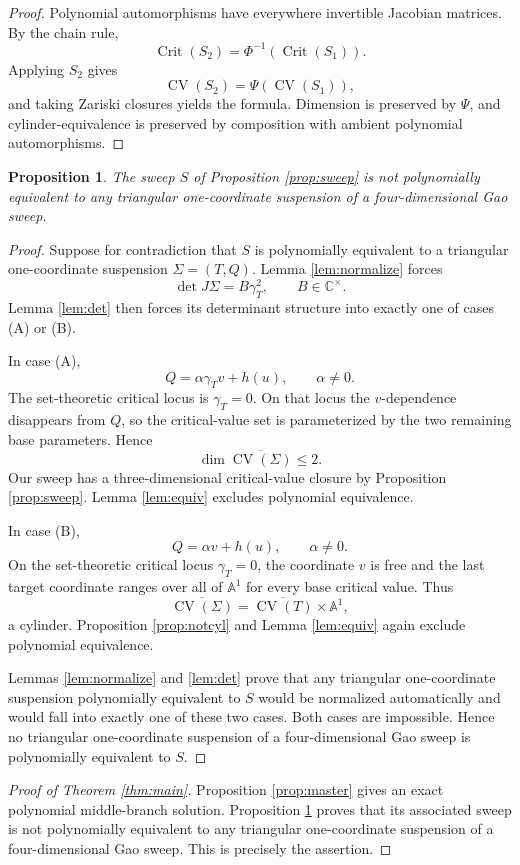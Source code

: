 \documentclass[11pt]{article}
\newtheorem{proposition}[theorem]{Proposition}
\theoremstyle{definition}
\newcommand{\A}{\mathbb A}
\newcommand{\C}{\mathbb C}
\newcommand{\Crit}{\operatorname{Crit}}
\newcommand{\CV}{\operatorname{CV}}
\begin{document}
\begin{proof}
Polynomial automorphisms have everywhere invertible Jacobian matrices. By the chain rule,
\[
\Crit(S_2)=\Phi^{-1}(\Crit(S_1)).
\]
Applying $S_2$ gives
\[
\CV(S_2)=\Psi(\CV(S_1)),
\]
and taking Zariski closures yields the formula. Dimension is preserved by $\Psi$, and cylinder-equivalence is preserved by composition with ambient polynomial automorphisms.
\end{proof}

\begin{proposition}\label{prop:exclude}
The sweep $S$ of Proposition \ref{prop:sweep} is not polynomially equivalent to any triangular one-coordinate suspension of a four-dimensional Gao sweep.
\end{proposition}

\begin{proof}
Suppose for contradiction that $S$ is polynomially equivalent to a triangular one-coordinate suspension $\Sigma=(T,Q)$. Lemma \ref{lem:normalize} forces
\[
\det J\Sigma=B\gamma_T^2,
\qquad B\in\C^\times.
\]
Lemma \ref{lem:det} then forces its determinant structure into exactly one of cases (A) or (B).

In case (A),
\[
Q=\alpha\gamma_T v+h(u),\qquad \alpha\neq0.
\]
The set-theoretic critical locus is $\gamma_T=0$. On that locus the $v$-dependence disappears from $Q$, so the critical-value set is parameterized by the two remaining base parameters. Hence
\[
\dim\overline{\CV(\Sigma)}\le2.
\]
Our sweep has a three-dimensional critical-value closure by Proposition \ref{prop:sweep}. Lemma \ref{lem:equiv} excludes polynomial equivalence.

In case (B),
\[
Q=\alpha v+h(u),\qquad \alpha\neq0.
\]
On the set-theoretic critical locus $\gamma_T=0$, the coordinate $v$ is free and the last target coordinate ranges over all of $\A^1$ for every base critical value. Thus
\[
\overline{\CV(\Sigma)}
=
\overline{\CV(T)}\times\A^1,
\]
a cylinder. Proposition \ref{prop:notcyl} and Lemma \ref{lem:equiv} again exclude polynomial equivalence.

Lemmas \ref{lem:normalize} and \ref{lem:det} prove that any triangular one-coordinate suspension polynomially equivalent to $S$ would be normalized automatically and would fall into exactly one of these two cases. Both cases are impossible. Hence no triangular one-coordinate suspension of a four-dimensional Gao sweep is polynomially equivalent to $S$.
\end{proof}

\begin{proof}[Proof of Theorem \ref{thm:main}]
Proposition \ref{prop:master} gives an exact polynomial middle-branch solution. Proposition \ref{prop:exclude} proves that its associated sweep is not polynomially equivalent to any triangular one-coordinate suspension of a four-dimensional Gao sweep. This is precisely the assertion.
\end{proof}
\end{document}

